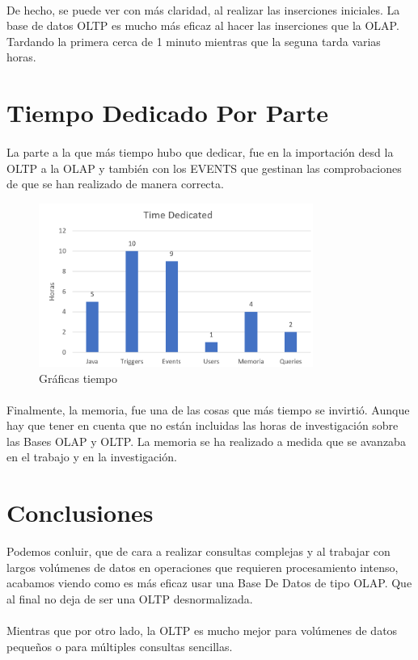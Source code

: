 \documentclass[a4paper 
,twoside
]{article}
\begin{document}
\paragraph{}
De hecho, se puede ver con más claridad, al realizar las inserciones iniciales. La base de datos OLTP es mucho más eficaz al hacer las inserciones que la OLAP. Tardando la primera cerca de 1 minuto mientras que la seguna tarda varias horas.
\pagebreak
\section{Tiempo Dedicado Por Parte}

  \paragraph{}
  La parte a la que más tiempo hubo que dedicar, fue en la importación desd la OLTP a la OLAP y también con los EVENTS que gestinan las comprobaciones de que se han realizado de manera correcta. 

  \begin{figure}[H]
    \centering
    \includegraphics[width=0.8\textwidth]{horas.png}
    \caption{Gráficas tiempo}
    \label{fig:specular}
  \end{figure}

  \paragraph{}
  Finalmente, la memoria, fue una de las cosas que más tiempo se invirtió. Aunque hay que tener en cuenta que no están incluidas las horas de investigación sobre las Bases OLAP y OLTP. La memoria se ha realizado a medida que se avanzaba en el trabajo y en la investigación.
\pagebreak
\section{Conclusiones}
Podemos conluir, que de cara a realizar consultas complejas y al trabajar con largos volúmenes de datos en operaciones que requieren procesamiento intenso, acabamos viendo como es más eficaz usar una Base De Datos de tipo OLAP. Que al final no deja de ser una OLTP desnormalizada.

\paragraph{}
Mientras que por otro lado, la OLTP es mucho mejor para volúmenes de datos pequeños o para múltiples consultas sencillas.

\pagebreak
  
  \nocite{*}
  \printbibliography[title={Bibliografía}]
\end{document}
